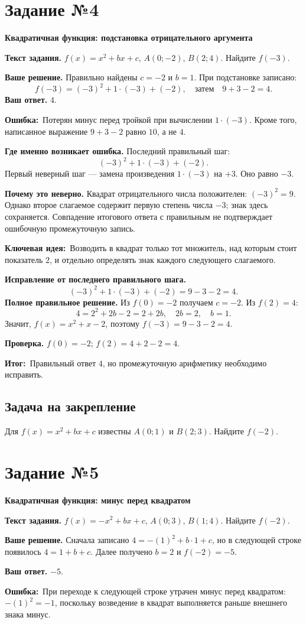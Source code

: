 \documentclass[a4paper,12pt]{article}
\newcommand{\err}{\textcolor{wrong}{\textbf{Ошибка:}}}
\newcommand{\idea}{\textcolor{accent}{\textbf{Ключевая идея:}}}
\newcommand{\res}{\textcolor{accent}{\textbf{Итог:}}}
\newcommand{\taskstart}[2]{\clearpage\phantomsection\label{task:#1}\section*{Задание №#1}\textcolor{accent}{\textbf{#2}}\par\medskip}
\begin{document}
\taskstart{4}{Квадратичная функция: подстановка отрицательного аргумента}
\textbf{Текст задания.} $f(x)=x^2+bx+c$, $A(0;-2)$, $B(2;4)$. Найдите $f(-3)$.

\textbf{Ваше решение.} Правильно найдены $c=-2$ и $b=1$. При подстановке записано:
\[
f(-3)=(-3)^2+1\cdot(-3)+(-2),
\quad \text{затем}\quad 9+3-2=4.
\]
\textbf{Ваш ответ.} $4$.

\err\ Потерян минус перед тройкой при вычислении $1\cdot(-3)$. Кроме того, написанное выражение $9+3-2$ равно $10$, а не $4$.

\textbf{Где именно возникает ошибка.} Последний правильный шаг:
\[
(-3)^2+1\cdot(-3)+(-2).
\]
Первый неверный шаг --- замена произведения $1\cdot(-3)$ на $+3$. Оно равно $-3$.

\textbf{Почему это неверно.} Квадрат отрицательного числа положителен: $(-3)^2=9$. Однако второе слагаемое содержит первую степень числа $-3$; знак здесь сохраняется. Совпадение итогового ответа с правильным не подтверждает ошибочную промежуточную запись.

\idea\ Возводить в квадрат только тот множитель, над которым стоит показатель $2$, и отдельно определять знак каждого следующего слагаемого.

\textbf{Исправление от последнего правильного шага.}
\[
(-3)^2+1\cdot(-3)+(-2)=9-3-2=\boxed{4}.
\]
\textbf{Полное правильное решение.} Из $f(0)=-2$ получаем $c=-2$. Из $f(2)=4$:
\[
4=2^2+2b-2=2+2b,
\quad 2b=2,
\quad b=1.
\]
Значит, $f(x)=x^2+x-2$, поэтому $f(-3)=9-3-2=4$.

\textbf{Проверка.} $f(0)=-2$; $f(2)=4+2-2=4$.

\res\ Правильный ответ $4$, но промежуточную арифметику необходимо исправить.

\subsection*{Задача на закрепление}
Для $f(x)=x^2+bx+c$ известны $A(0;1)$ и $B(2;3)$. Найдите $f(-2)$.

\taskstart{5}{Квадратичная функция: минус перед квадратом}
\textbf{Текст задания.} $f(x)=-x^2+bx+c$, $A(0;3)$, $B(1;4)$. Найдите $f(-2)$.

\textbf{Ваше решение.} Сначала записано $4=-(1)^2+b\cdot1+c$, но в следующей строке появилось $4=1+b+c$. Далее получено $b=2$ и $f(-2)=-5$.

\textbf{Ваш ответ.} $-5$.

\err\ При переходе к следующей строке утрачен минус перед квадратом: $-(1)^2=-1$, поскольку возведение в квадрат выполняется раньше внешнего знака минус.
\end{document}
